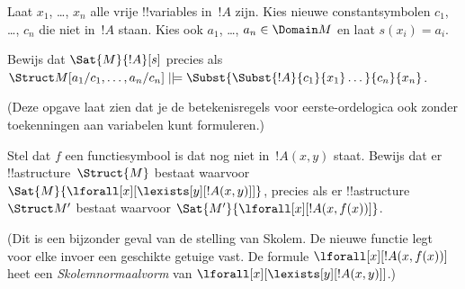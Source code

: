 \documentclass[../../../include/open-logic-section]{subfiles}
\begin{document}
\begin{prob}
\begin{enumerate}
\end{enumerate}
Laat $x_1$, \dots, $x_n$ alle vrije !!{variable}s in~$!A$ zijn.
Kies nieuwe constantsymbolen $c_1$, \dots, $c_n$ die niet in~$!A$
staan. Kies ook $a_1$, \dots, $a_n \in \Domain M$ en laat
$s(x_i) = a_i$.

Bewijs dat $\Sat{M}{!A}[s]$ precies als
$\Struct M[a_1/c_1,\dots,a_n/c_n]
\VDash \Subst{\Subst{!A}{c_1}{x_1}\dots}{c_n}{x_n}$.

(Deze opgave laat zien dat je de betekenisregels voor eerste-ordelogica
ook zonder toekenningen aan variabelen kunt formuleren.)
\end{prob}

\begin{prob}
Stel dat $f$ een functiesymbool is dat nog niet in~$!A(x,y)$ staat.
Bewijs dat er !!a{structure}~$\Struct{M}$ bestaat waarvoor
$\Sat{M}{\lforall[x][\lexists[y][!A(x,y)]]}$, precies als er
!!a{structure}~$\Struct M'$ bestaat waarvoor
$\Sat{M'}{\lforall[x][!A(x,f(x))]}$.

(Dit is een bijzonder geval van de stelling van Skolem. De nieuwe
functie legt voor elke invoer een geschikte getuige vast. De formule
$\lforall[x][!A(x,f(x))]$ heet een
\emph{Skolemnormaalvorm} van
$\lforall[x][\lexists[y][!A(x,y)]]$.)
\end{prob}
\end{document}

